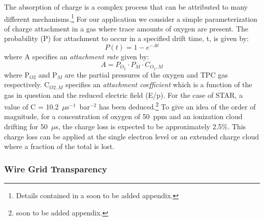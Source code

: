 \documentclass{article}
\begin{document}
The absorption of charge is a complex process that
can be attributed to many different mechanisms.\footnote{Details
  contained in a soon to be added appendix.}
For our application we consider a simple parameterization of charge
attachment in a gas where trace amounts of oxygen are present.  The
probability (P) for attachment to occur in a specified drift time, t,
is given by:        
\begin{equation}
             P(t) = 1 - e^{-At}
\label{eq:attach}
\end{equation}
where A specifies an {\em attachment rate} given by:
\begin{equation}
            A = P_{O_{2}} \cdot P_{M} \cdot C_{O_{2},M}
\label{eq:attachrate}
\end{equation}
where P$_{O2}$ and P$_{M}$ are the partial
pressures of the oxygen and TPC gas respectively.
C$_{O2,M}$ specifies an {\em attachment coefficient} which
is a function of the gas in question and the reduced electric field (E/p).
For the case of STAR, a value of C = 10.2~$\mu$s$^{-1}$~bar$^{-2}$
has been deduced.\footnote{soon to be added appendix.}
To give an idea of the order of magnitude, for a concentration
of oxygen of 50~ppm and an ionization cloud drifting for
50~$\mu$s, the charge loss is expected to be approximately 2.5\%.
This charge loss can be applied at the single electron level or
an extended charge cloud where a fraction of the total is lost.

\subsubsection{Wire Grid Transparency}
        
\end{document}
